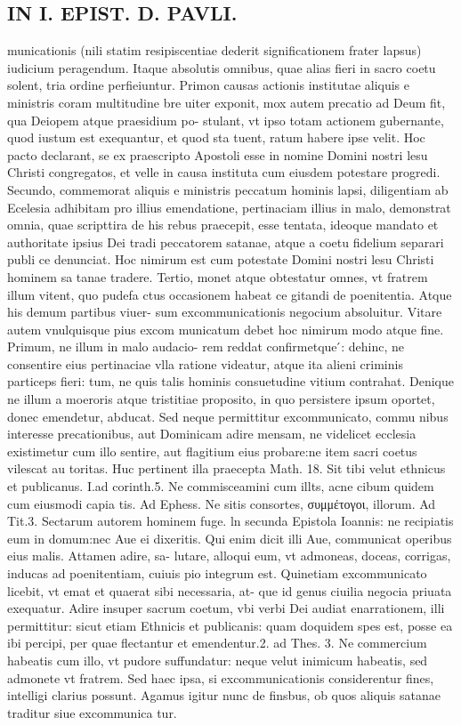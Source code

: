 \documentclass{article}
\begin{document}
\begin{pages}
\section*{IN I. EPIST. D. PAVLI. }
\marginpar{[ p.72 ]}\pstart municationis (nili statim resipiscentiae dederit significationem frater lapsus) iudicium peragendum. Itaque  absolutis omnibus, quae alias fieri in sacro coetu solent, tria ordine perfieiuntur. Primon causas actionis institutae aliquis e ministris coram multitudine bre uiter exponit, mox autem precatio ad Deum fit, qua Deiopem atque praesidium po- stulant, vt ipso totam actionem gubernante, quod iustum est exequantur, et quod sta tuent, ratum habere ipse velit. Hoc pacto declarant, se ex praescripto Apostoli esse in nomine Domini nostri lesu Christi congregatos, et velle in causa instituta cum eiusdem potestare progredi. Secundo, commemorat aliquis e ministris peccatum hominis lapsi, diligentiam ab Ecelesia adhibitam pro illius emendatione, pertinaciam illius in malo, demonstrat omnia, quae scripttira de his rebus praecepit, esse tentata, ideoque  mandato et authoritate ipsius Dei tradi peccatorem satanae, atque  a coetu fidelium separari publi ce denunciat. Hoc nimirum est cum potestate Domini nostri lesu Christi hominem sa tanae tradere. Tertio, monet atque  obtestatur omnes, vt fratrem illum vitent, quo pudefa ctus occasionem habeat ce gitandi de poenitentia. Atque his demum partibus viuer- sum excommunicationis negocium absoluitur. Vitare autem vnulquisque  pius excom municatum debet hoc nimirum modo atque  fine. Primum, ne illum in malo audacio- rem reddat confirmetque ́: dehinc, ne consentire eius pertinaciae vlla ratione videatur, atque  ita alieni criminis particeps fieri: tum, ne quis talis hominis consuetudine vitium contrahat. Denique  ne illum a moeroris atque  tristitiae proposito, in quo persistere ipsum oportet, donec emendetur, abducat. Sed neque  permittitur excommunicato, commu nibus interesse precationibus, aut Dominicam adire mensam, ne videlicet ecclesia existimetur cum illo sentire, aut flagitium eius probare:ne item sacri coetus vilescat au toritas. Huc pertinent illa praecepta Math. 18. Sit tibi velut ethnicus et publicanus. I.ad corinth.5. Ne commisceamini cum illts, acne cibum quidem cum eiusmodi capia tis. Ad Ephess. Ne sitis consortes, συμμέτογοι, illorum. Ad Tit.3. Sectarum autorem hominem fuge. ln secunda Epistola Ioannis: ne recipiatis eum in domum:nec Aue ei dixeritis. Qui enim dicit illi Aue, communicat operibus eius malis. Attamen adire, sa- lutare, alloqui eum, vt admoneas, doceas, corrigas, inducas ad poenitentiam, cuiuis pio integrum est. Quinetiam excommunicato licebit, vt emat et quaerat sibi necessaria, at- que id genus ciuilia negocia priuata exequatur. Adire insuper sacrum coetum, vbi verbi Dei audiat enarrationem, illi permittitur: sicut etiam Ethnicis et publicanis: quam doquidem spes est, posse ea ibi percipi, per quae flectantur et emendentur.2. ad Thes. 3. Ne commercium habeatis cum illo, vt pudore suffundatur: neque velut inimicum habeatis, sed admonete vt fratrem. Sed haec ipsa, si excommunicationis considerentur fines, intelligi clarius possunt.  \pend\pstart Agamus igitur nunc de finsbus, ob quos aliquis satanae traditur siue excommunica tur. 
\end{pages}
\end{document}
